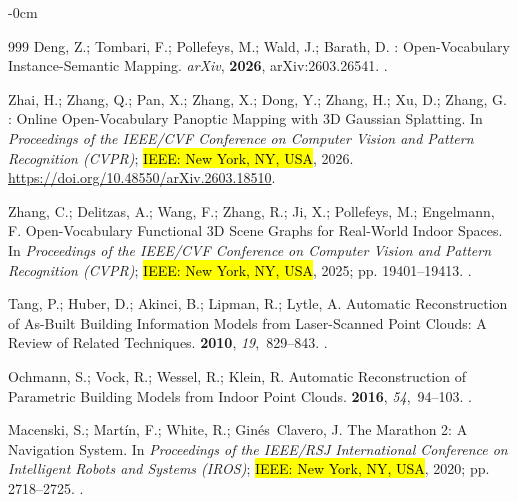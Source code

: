 \documentclass[electronics,article,accept,pdftex,moreauthors]{Definitions/mdpi}
\begin{document}
\begin{adjustwidth}{-\extralength}{0cm}
\begin{thebibliography}{999}
Deng, Z.; Tombari, F.; Pollefeys, M.; Wald, J.; Barath, D.
: Open-Vocabulary Instance-Semantic Mapping.
\newblock \textit{arXiv},  \textbf{2026},  arXiv:2603.26541.
.

Zhai, H.; Zhang, Q.; Pan, X.; Zhang, X.; Dong, Y.; Zhang, H.; Xu, D.; Zhang, G.
: Online Open-Vocabulary Panoptic Mapping with {3D}
  {Gaussian} Splatting.
\newblock In \textit{Proceedings of the IEEE/CVF Conference on Computer Vision and
  Pattern Recognition (CVPR)}; \hl{IEEE: New York, NY, USA},  {2026}.
 {\url{https://doi.org/10.48550/arXiv.2603.18510}}.

Zhang, C.; Delitzas, A.; Wang, F.; Zhang, R.; Ji, X.; Pollefeys, M.; Engelmann,
  F.
\newblock Open-Vocabulary Functional {3D} Scene Graphs for Real-World Indoor
  Spaces.
\newblock In \textit{Proceedings of the IEEE/CVF Conference on Computer Vision and
  Pattern Recognition (CVPR)}; \hl{IEEE: New York, NY, USA},  2025; pp. 19401--19413.
.

Tang, P.; Huber, D.; Akinci, B.; Lipman, R.; Lytle, A.
\newblock Automatic Reconstruction of As-Built Building Information Models from
  Laser-Scanned Point Clouds: A Review of Related Techniques.
 {\bf 2010}, {\em 19},~829--843.
.

Ochmann, S.; Vock, R.; Wessel, R.; Klein, R.
\newblock Automatic Reconstruction of Parametric Building Models from Indoor
  Point Clouds.
 {\bf 2016}, {\em 54},~94--103.
.

Macenski, S.; Mart{\'i}n, F.; White, R.; Gin{\'e}s~Clavero, J.
\newblock The Marathon 2: A Navigation System.
\newblock In \textit{Proceedings of the IEEE/RSJ International Conference on Intelligent Robots and
  Systems (IROS)}; \hl{IEEE: New York, NY, USA}, 2020; pp. 2718--2725.
.


\end{thebibliography}
\end{adjustwidth}
\end{document}
